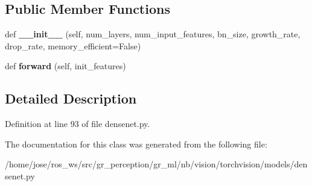 \subsection*{Public Member Functions}
\begin{DoxyCompactItemize}
\item 
\mbox{\label{classtorchvision_1_1models_1_1densenet_1_1__DenseBlock_ab706187c8ead2ef16c70afc3586c64c2}} 
def {\bfseries \+\_\+\+\_\+init\+\_\+\+\_\+} (self, num\+\_\+layers, num\+\_\+input\+\_\+features, bn\+\_\+size, growth\+\_\+rate, drop\+\_\+rate, memory\+\_\+efficient=False)
\item 
\mbox{\label{classtorchvision_1_1models_1_1densenet_1_1__DenseBlock_ab9d463a6490a89f9a6e2244609a64ab3}} 
def {\bfseries forward} (self, init\+\_\+features)
\end{DoxyCompactItemize}


\subsection{Detailed Description}


Definition at line 93 of file densenet.\+py.



The documentation for this class was generated from the following file\+:\begin{DoxyCompactItemize}
\item 
/home/jose/ros\+\_\+ws/src/gr\+\_\+perception/gr\+\_\+ml/nb/vision/torchvision/models/densenet.\+py\end{DoxyCompactItemize}
